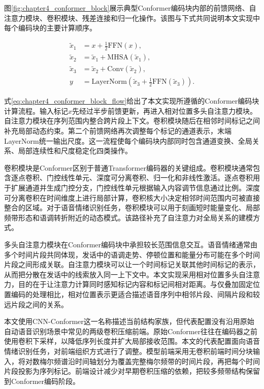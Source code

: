 图\ref{fig:chapter4_conformer_block}展示典型Conformer编码块内部的前馈网络、自注意力模块、卷积模块、残差连接和归一化操作。该图与下式共同说明本文实现中每个编码块的主要计算顺序。

\begin{equation}
\begin{aligned}
\tilde{x}_1 &= x + \frac{1}{2}\mathrm{FFN}(x),\\
\tilde{x}_2 &= \tilde{x}_1 + \mathrm{MHSA}(\tilde{x}_1),\\
\tilde{x}_3 &= \tilde{x}_2 + \mathrm{Conv}(\tilde{x}_2),\\
y &= \mathrm{LayerNorm}\left(\tilde{x}_3 + \frac{1}{2}\mathrm{FFN}(\tilde{x}_3)\right).
\end{aligned}
\label{eq:chapter4_conformer_block_flow}
\end{equation}

式\ref{eq:chapter4_conformer_block_flow}给出了本文实现所遵循的Conformer编码块计算流程。输入标记$x$先经过半步前馈更新，再进入相对位置多头自注意力模块。自注意力模块在序列范围内整合跨片段上下文。卷积模块随后在相邻时间标记之间补充局部动态约束。第二个前馈网络再次调整每个标记的通道表示，末端LayerNorm统一输出尺度。这一流程使每个编码块内部同时包含通道变换、全局关系、局部连续性和尺度稳定化四类操作。

卷积模块是Conformer区别于普通Transformer编码器的关键组成。卷积模块通常包含逐点卷积、门控线性单元、深度可分离卷积、归一化和非线性激活。逐点卷积用于扩展通道并生成门控分支，门控线性单元根据输入内容调节信息通过比例。深度可分离卷积在时间维度上进行局部计算，卷积核大小决定相邻时间范围内可被直接整合的区域。对于语音情绪识别任务，卷积模块可以用于刻画短时能量变化、局部频带形态和语调转折附近的动态模式。该路径补充了自注意力对全局关系的建模方式。

多头自注意力模块在Conformer编码块中承担较长范围信息交互。语音情绪通常由多个时间片段共同体现，发话中的语调走势、停顿位置和能量分布可能在多个时间片段之间形成关联。自注意力模块可以让一个时间标记关联其他时间标记的表示，从而把分散在发话中的线索放入同一上下文中。本文实现采用相对位置多头自注意力，目的在于让注意力计算同时感知标记内容和标记间相对距离。与仅叠加固定位置编码的处理相比，相对位置表示更适合描述语音序列中相邻片段、间隔片段和较远片段之间的关系\cite{gulati2020conformer}。

本文使用CNN-Conformer这一名称描述当前结构家族，但代表配置没有沿用原始自动语音识别场景中常见的两级卷积压缩前端。原始Conformer往往在编码器之前使用卷积下采样，以降低序列长度并扩大局部接收范围\cite{gulati2020conformer}。本文的代表配置面向语音情绪识别任务，对前端组织方式进行了调整。模型前端采用无卷积前端时间分块输入，将对数梅尔频谱沿时间轴划分为覆盖完整梅尔频带的时间片段，再把每个时间片段投影为序列标记。前端设计减少对早期卷积压缩的依赖，把较多频带结构保留到Conformer编码阶段。

